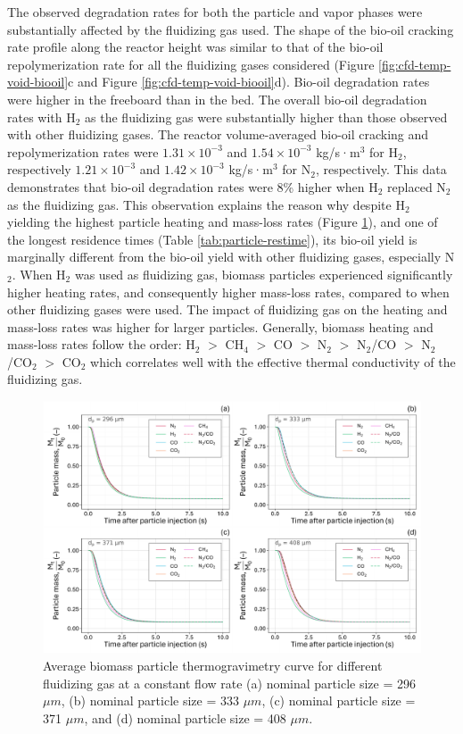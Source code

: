 \documentclass{article}
\begin{document}
The observed degradation rates for both the particle and vapor phases were substantially affected by the fluidizing gas used. The shape of the bio-oil cracking rate profile along the reactor height was similar to that of the bio-oil repolymerization rate for all the fluidizing gases considered (Figure \ref{fig:cfd-temp-void-biooil}c and Figure \ref{fig:cfd-temp-void-biooil}d). Bio-oil degradation rates were higher in the freeboard than in the bed. The overall bio-oil degradation rates with H$_2$ as the fluidizing gas were substantially higher than those observed with other fluidizing gases. The reactor volume-averaged bio-oil cracking and repolymerization rates were $1.31\times10^{-3}$ and $1.54\times10^{-3}$ kg/s·m$^3$ for H$_2$, respectively $1.21\times10^{-3}$ and $1.42\times10^{-3}$ kg/s·m$^3$ for N$_2$, respectively. This data demonstrates that bio-oil degradation rates were 8\% higher when H$_2$ replaced N$_2$ as the fluidizing gas. This observation explains the reason why despite H$_2$ yielding the highest particle heating and mass-loss rates (Figure \ref{fig:cfd-masspercent}), and one of the longest residence times (Table \ref{tab:particle-restime}), its bio-oil yield is marginally different from the bio-oil yield with other fluidizing gases, especially N$_2$. When H$_2$ was used as fluidizing gas, biomass particles experienced significantly higher heating rates, and consequently higher mass-loss rates, compared to when other fluidizing gases were used. The impact of fluidizing gas on the heating and mass-loss rates was higher for larger particles. Generally, biomass heating and mass-loss rates follow the order: H$_2$ $>$ CH$_4$ $>$ CO $>$ N$_2$ $>$ N$_2$/CO $>$ N$_2$/CO$_2$ $>$ CO$_2$ which correlates well with the effective thermal conductivity of the fluidizing gas.

\begin{figure}[H]
    \centering
    \includegraphics[width=1.0\textwidth]{figures/cfd-masspercent.pdf}
    \caption{Average biomass particle thermogravimetry curve for different fluidizing gas at a constant flow rate (a) nominal particle size = 296 $\mu m$, (b) nominal particle size = 333 $\mu m$, (c) nominal particle size = 371 $\mu m$, and (d) nominal particle size = 408 $\mu m$.}
    \label{fig:cfd-masspercent}
\end{figure}
\end{document}
